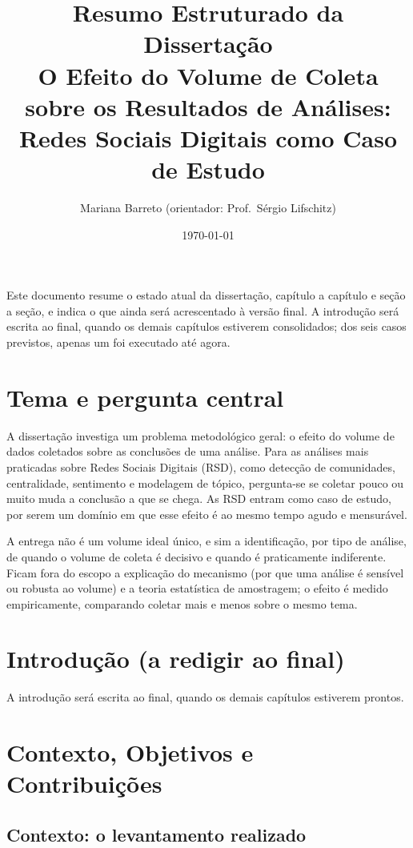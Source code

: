 \documentclass[12pt,a4paper]{article}
\title{Resumo Estruturado da Dissertação\\
\large O Efeito do Volume de Coleta sobre os Resultados de Análises:\\
Redes Sociais Digitais como Caso de Estudo}
\author{Mariana Barreto \quad (orientador: Prof.\ Sérgio Lifschitz)}
\date{\today}
\begin{document}
\maketitle

\noindent Este documento resume o estado atual da dissertação, capítulo a capítulo
e seção a seção, e indica o que ainda será acrescentado à versão final. A
introdução será escrita ao final, quando os demais capítulos estiverem
consolidados; dos seis casos previstos, apenas um foi executado até agora.

\section{Tema e pergunta central}

A dissertação investiga um problema metodológico geral: o efeito do volume de
dados coletados sobre as conclusões de uma análise. Para as análises mais
praticadas sobre Redes Sociais Digitais (RSD), como detecção de comunidades,
centralidade, sentimento e modelagem de tópico, pergunta-se se coletar pouco ou
muito muda a conclusão a que se chega. As RSD entram como caso de estudo, por
serem um domínio em que esse efeito é ao mesmo tempo agudo e mensurável.

A entrega não é um volume ideal único, e sim a identificação, por tipo de
análise, de quando o volume de coleta é decisivo e quando é praticamente
indiferente. Ficam fora do escopo a explicação do mecanismo (por que uma análise é
sensível ou robusta ao volume) e a teoria estatística de amostragem; o efeito é
medido empiricamente, comparando coletar mais e menos sobre o mesmo tema.

\section{Introdução (a redigir ao final)}

A introdução será escrita ao final, quando os demais capítulos estiverem prontos.

\section{Contexto, Objetivos e Contribuições}

\subsection{Contexto: o levantamento realizado}
\end{document}

